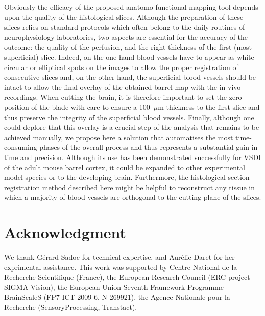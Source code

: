 Obviously the efficacy of the proposed anatomo-functional mapping tool depends upon the quality of the histological slices. Although the preparation of these slices relies on standard protocols which often belong to the daily routines of neurophysiology laboratories, two aspects are essential for the accuracy of the outcome: the quality of the perfusion, and the right thickness of the first (most superficial) slice. Indeed, on the one hand blood vessels have to appear as white circular or elliptical spots on the images to allow the proper registration of consecutive slices and, on the other hand, the superficial blood vessels should be intact to allow the final overlay of the obtained barrel map with the in vivo recordings. 
%
When cutting the brain, it is therefore important to set the zero position of the blade with care to ensure a 100~$\mu$m thickness to the first slice and thus preserve the integrity of the superficial blood vessels.
%
Finally, although one could deplore that this overlay is a crucial step of the analysis that remains to be achieved manually, we propose here a solution that automatises the most time-consuming phases of the overall process and thus represents a substantial gain in time and precision.
%
Although its use has been demonstrated successfully for VSDI of the adult mouse barrel cortex, it could be expanded to other experimental model species or to the developing brain. Furthermore, the histological section registration method described here might be helpful to reconstruct any tissue in which a majority of blood vessels are orthogonal to the cutting plane of the slices.



\section*{Acknowledgment}

We thank G\'erard Sadoc for technical expertise, and Aur\'elie Daret for her exprimental assistance.
%
This work was supported by Centre National de la Recherche Scientifique (France), the European Research Council (ERC project SIGMA-Vision), the European Union Seventh Framework Programme BrainScaleS (FP7-ICT-2009-6, N 269921), the Agence Nationale pour la Recherche (SensoryProcessing, Transtact).
